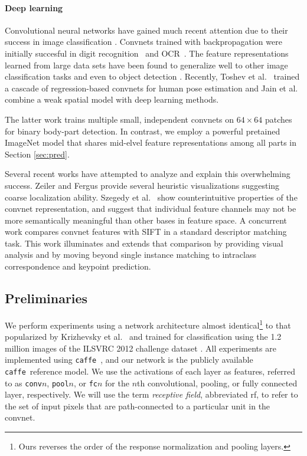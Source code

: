 \documentclass{article} \usepackage{nips14submit_e,times}
\newcommand{\caffe}{\texttt{caffe}}
\begin{document}
\paragraph{Deep learning}
Convolutional neural networks have gained much recent attention due to their
success in image classification \cite{Krizhevsky}. Convnets trained with
backpropagation were initially
succesful in digit recognition~\cite{Lecun89} and OCR~\cite{Lecun98OCR}.
The feature representations learned from large data
sets have been found to generalize well to other image classification tasks
\cite{decaf} and even to object detection \cite{RossJeff, sermanet-cvpr13}.
Recently, Toshev et al.\ \cite{deep_pose} trained a cascade of regression-based
convnets for human pose estimation and Jain et al.\ \cite{HumanPoseICLR} combine
a weak spatial model with deep learning methods.

The latter work trains multiple small, independent convnets on $64 \times 64$ patches
for binary body-part detection. In contrast, we employ a powerful pretained
ImageNet model that shares mid-elvel feature representations among all parts
in Section \ref{sec:pred}.

Several recent works have attempted to analyze and explain this overwhelming
success. Zeiler and Fergus \cite{ZF} provide several heuristic visualizations
suggesting coarse localization ability.
Szegedy et al.\ \cite{Szegedy} show
counterintuitive properties of the convnet representation, and suggest that
individual feature channels may not be more semantically meaningful than other
bases in feature space.
A concurrent work \cite{Fischer}
compares convnet features with SIFT in a standard descriptor matching task.
This work illuminates and extends that comparison by providing visual analysis
and by moving beyond single instance matching to intraclass correspondence and keypoint prediction.

\subsection{Preliminaries}

We perform experiments using a network architecture almost
identical\footnote{Ours reverses the order of the response normalization and
pooling layers.} to that popularized by Krizhevsky et
al.\ \cite{Krizhevsky} and trained for classification using the 1.2 million
images of the ILSVRC 2012 challenge dataset \cite{ImageNet}.
All experiments are implemented using \caffe\ \cite{caffe}, and our network is
the publicly available \caffe\ reference model.
We use the activations of each layer as features, referred to as
\texttt{conv}$n$, \texttt{pool}$n$, or \texttt{fc}$n$ for the $n$th convolutional,
pooling, or fully connected layer, respectively.
We will use the term \emph{receptive field}, abbreviated rf, to refer to the
set of input pixels that are path-connected to a particular unit in the convnet.
\end{document}
